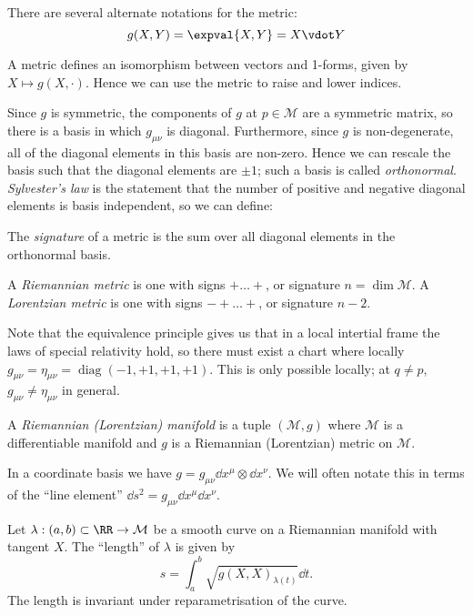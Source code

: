 \documentclass{jknotes}
\begin{document}
There are several alternate notations for the metric:
\begin{equation}
    g(X,Y) = \expval{X,Y} = X\vdot Y
\end{equation}

A metric defines an isomorphism between vectors and 1-forms, given by \(X\mapsto g(X,\cdot)\). Hence we can use the metric to raise and lower indices.

Since \(g\) is symmetric, the components of \(g\) at \(p\in\mathcal{M}\) are a symmetric matrix, so there is a basis in which \(g_{\mu\nu}\) is diagonal. Furthermore, since \(g\) is non-degenerate, all of the diagonal elements in this basis are non-zero. Hence we can rescale the basis such that the diagonal elements are \(\pm1\); such a basis is called \emph{orthonormal}. \emph{Sylvester's law} is the statement that the number of positive and negative diagonal elements is basis independent, so we can define:
\begin{defn}
    The \emph{signature} of a metric is the sum over all diagonal elements in the orthonormal basis.
\end{defn}
\begin{defn}
    A \emph{Riemannian metric} is one with signs \(+\dots+\), or signature \(n=\dim\mathcal{M}\). A \emph{Lorentzian metric} is one with signs \(-+\dots+\), or signature \(n-2\).
\end{defn}

Note that the equivalence principle gives us that in a local intertial frame the laws of special relativity hold, so there must exist a chart where locally \(g_{\mu\nu}=\eta_{\mu\nu} = \operatorname{diag}(-1,+1,+1,+1)\). This is only possible locally; at \(q\ne p\), \(g_{\mu\nu}\ne\eta_{\mu\nu}\) in general.

\begin{defn}
    A \emph{Riemannian (Lorentzian) manifold} is a tuple \((\mathcal{M},g)\) where \(\mathcal{M}\) is a differentiable manifold and \(g\) is a Riemannian (Lorentzian) metric on \(\mathcal{M}\).
\end{defn}

In a coordinate basis we have \(g=g_{\mu\nu}\dd{x^\mu}\otimes\dd{x^\nu}\). We will often notate this in terms of the ``line element'' \(\dd{s}^2=g_{\mu\nu}\dd{x^\mu}\dd{x^\nu}\).

Let \(\lambda:(a,b)\subset\RR\to\mathcal{M}\) be a smooth curve on a Riemannian manifold with tangent \(X\). The ``length'' of \(\lambda\) is given by
\begin{equation}
    s = \int_a^b\sqrt{g(X,X)_{\lambda(t)}} \dd{t}.
\end{equation}
The length is invariant under reparametrisation of the curve.
\end{document}
